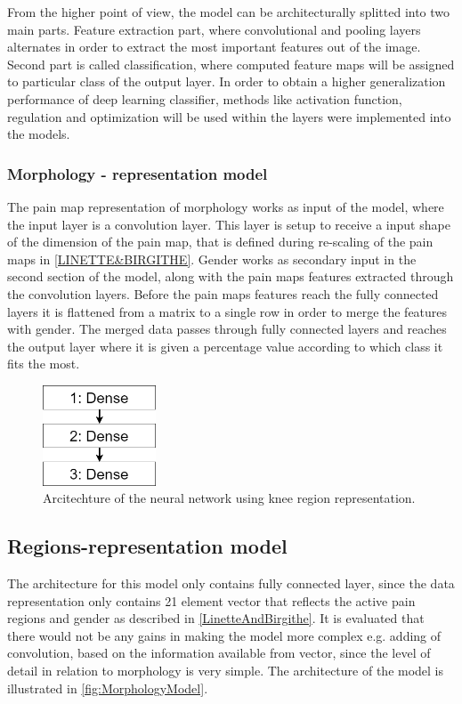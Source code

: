 From the higher point of view, the model can be architecturally splitted into two main parts. Feature extraction part, where convolutional and pooling layers alternates in order to extract the most important features out of the image. Second part is called classification, where computed feature maps will be assigned to particular class of the output layer. In order to obtain a higher generalization performance of deep learning classifier, methods like activation function, regulation and optimization will be used within the layers were implemented into the models.

\subsubsection{Morphology - representation model}
The pain map representation of morphology works as input of the model, where the input layer is a convolution layer. This layer is setup to receive a input shape of the dimension of the pain map, that is defined during re-scaling of the pain maps in \ref{LINETTE&BIRGITHE}. Gender works as secondary input in the second section of the model, along with the pain maps features extracted through the convolution layers. Before the pain maps features reach the fully connected layers it is flattened from a matrix to a single row in order to merge the features with gender. The merged data passes through fully connected layers and reaches the output layer where it is given a percentage value according to which class it fits the most.

\begin{figure} [H]
\centering
\includegraphics[width=0.3\textwidth]{figures/simpleModel}
\caption{Arcitechture of the neural network using knee region representation.}
\label{fig:simpleModel} 
\end{figure}

\subsection{Regions-representation model}
The architecture for this model only contains fully connected layer, since the data representation only contains 21 element vector that reflects the active pain regions and gender as described in \autoref{LinetteAndBirgithe}. It is evaluated that there would not be any gains in making the model more complex e.g. adding of convolution, based on the information available from vector, since the level of detail in relation to morphology is very simple. The architecture of the model is illustrated in \autoref{fig:MorphologyModel}.

